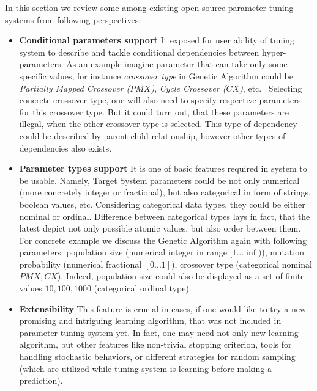 
In this section we review some among existing open-source parameter tuning systems from following perspectives:%
\begin{itemize}
	\item \textbf{Conditional parameters support} It exposed for user ability of tuning system to describe and tackle conditional dependencies between hyper-parameters. As an example imagine parameter that can take only some specific values, for instance \textit{crossover type} in Genetic Algorithm could be \textit{Partially Mapped Crossover ($PMX$)}, \textit{Cycle Crossover ($CX$)}, etc.~\cite{larranaga1999genetic} Selecting concrete crossover type, one will also need to specify respective parameters for this crossover type. But it could turn out, that these parameters are illegal, when the other crossover type is selected. This type of dependency could be described by parent-child relationship, however other types of dependencies also exists.
	
	\item \textbf{Parameter types support} It is one of basic features required in system to be usable. Namely, Target System parameters could be not only numerical (more concretely integer or fractional), but also categorical in form of strings, boolean values, etc. Considering categorical data types, they could be either nominal or ordinal. Difference between categorical types lays in fact, that the latest depict not only possible atomic values, but also order between them. For concrete example we discuss the Genetic Algorithm again with following parameters: population size (numerical integer in range $[1...\inf)$), mutation probability (numerical fractional $[0...1]$), crossover type (categorical nominal ${PMX, CX}$). Indeed, population size could also be displayed as a set of finite values ${10, 100, 1000}$ (categorical ordinal type).
	
	\item \textbf{Extensibility} This feature is crucial in cases, if one would like to try a new promising and intriguing learning algorithm, that was not included in parameter tuning system yet. In fact, one may need not only new learning algorithm, but other features like non-trivial stopping criterion, tools for handling stochastic behaviors, or different strategies for random sampling (which are utilized while tuning system is learning before making a prediction).
	

\end{itemize}
